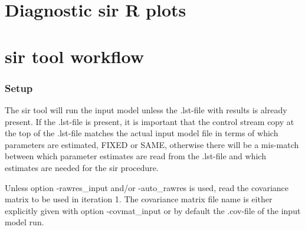 \section{Diagnostic sir R plots}
\newcommand{\rplotsconditions}{
See section Output, subsections Basic and Extended diagnostic  R plots, for descriptions of the default sir R plots. The default sir template requires that R libraries gplots, ggplot2, plyr, dplyr, reshape, gridExtra, RColorBrewer, tidyr, MCMCpack and stats4 are installed. If the conditions are not fulfilled then no pdf will be generated, see the .Rout file in the main run directory for error messages.}



\section{sir tool workflow}
\subsubsection*{Setup}
The sir tool will run the input model unless the .lst-file with results is already present. If the .lst-file is present, it
is important that the control stream copy at the top of the .lst-file matches the actual input model file in terms of which parameters are estimated, FIXED or SAME, otherwise there will be a mis-match between which parameter estimates are read from the .lst-file and which estimates are needed for the sir procedure.

Unless option -rawres\_input and/or -auto\_rawres is used, read the covariance matrix to be used in iteration 1. The covariance matrix file name is either explicitly given with option -covmat\_input or by default the .cov-file of the input model run.

